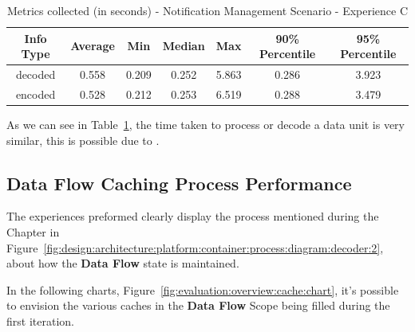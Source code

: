 \begin{table}[H]
    \caption{Metrics collected (in seconds) - Notification Management Scenario - Experience C}
    \label{tab:evaluation:overview:decoproc:results}
    \centering
    \begin{tabular}{@{}ccccccc@{}}
    \toprule
    \textbf{Info Type} & \textbf{Average} & \textbf{Min} & \textbf{Median} & \textbf{Max} & \textbf{90\% Percentile} & \textbf{95\% Percentile} \\ \midrule
    decoded & 0.558 & 0.209 & 0.252 & 5.863 & 0.286 & 3.923 \\ \midrule
    encoded & 0.528 & 0.212 & 0.253 & 6.519 & 0.288 & 3.479 \\ \bottomrule
    \end{tabular}
\end{table}

As we can see in Table~\ref{tab:evaluation:overview:decoproc:results}, the time taken to process or decode a data unit is very similar, this is possible due to .

\subsection{Data Flow Caching Process Performance}
\label{subsubsec:evaluation:overview:cache}

The experiences preformed clearly display the process mentioned during the  Chapter in Figure~\ref{fig:design:architecture:platform:container:process:diagram:decoder:2}, about how the \textbf{Data Flow} state is maintained.

In the following charts, Figure~\ref{fig:evaluation:overview:cache:chart}, it's possible to envision the various caches in the \textbf{Data Flow} Scope being filled during the first iteration.

